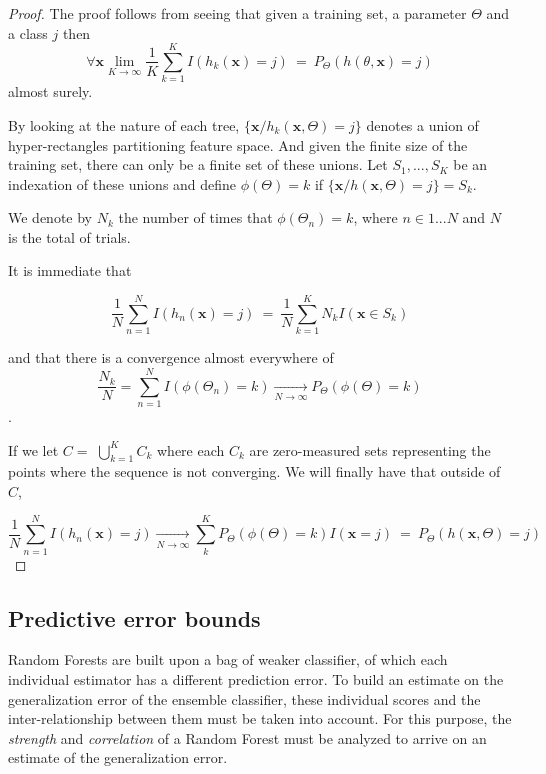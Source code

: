 \documentclass{article}%
\theoremstyle{definition}
\begin{document}
\begin{proof}
The proof follows from seeing that given a training set, a parameter $\Theta$ and a class $j$ then 
$$\forall \textbf{x} \lim_{K\to\infty} \frac{1}{K} \sum_{k=1}^K I(h_k(\textbf{x}) = j) \ =   \ P_\Theta(h(\theta,\textbf{x}) = j) $$
 almost surely.

By looking at the nature of each tree, $\{\textbf{x} / h_k(\textbf{x}, \Theta) = j \}$ denotes a union of hyper-rectangles partitioning feature space. And given the finite size of the training set, there can only be a finite set of these unions. Let $S_1, ..., S_K$ be an indexation of these unions and define $\phi(\Theta) = k $ if $\{\textbf{x} / h(\textbf{x}, \Theta) = j \} = S_k$. 

We denote by $N_k$ the number of times that $\phi(\Theta_n) =k $, where $n \in {1...N}$ and $N$ is the total of trials.

It is immediate that 

$$ \frac{1}{N} \sum_{n=1}^N I(h_n(\textbf{x}) = j) \ = \  \frac{1}{N} \sum_{k=1}^K N_k I(\textbf{x} \in S_k)  $$

and that there is a convergence almost everywhere of $$ \frac{N_k}{N} = \sum_{n=1}^N  I(\phi(\Theta_n) = k)  \xrightarrow[N \to \infty] {}  P_{\Theta}(\phi(\Theta)= k)$$. 

If we let $C = $ $\bigcup\limits_{k=1}^{K} C_{k}$ where each $C_k$ are zero-measured sets representing the points where the sequence is not converging. We will finally have that  outside of $C$, 

$$ \frac{1}{N} \sum_{n=1}^N I(h_n(\textbf{x}) = j) \xrightarrow[N \to \infty]{} \sum_k^K    P_{\Theta}(\phi(\Theta)= k) I(\textbf{x} =j ) \ = \ P_{\Theta}(h(\textbf{x}, \Theta) = j)  $$ 
\end{proof}

\subsection{Predictive error bounds}

Random Forests are built upon a bag of weaker classifier, of which each individual estimator has a different prediction error. To build an estimate on the generalization error of the ensemble classifier, these individual scores and the inter-relationship between them must be taken into account. For this purpose, the \textit{strength} and \textit{correlation} of a Random Forest must be analyzed to arrive on an estimate of the generalization error.
\end{document}
